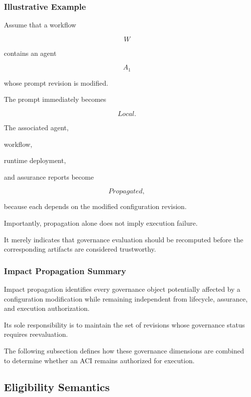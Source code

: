 \documentclass[10pt]{article}
\begin{document}
\subsubsection{Illustrative Example}

Assume that a workflow

\[
W
\]

contains an agent

\[
A_1
\]

whose prompt revision is modified.

The prompt immediately becomes

\[
Local.
\]

The associated agent,

workflow,

runtime deployment,

and assurance reports become

\[
Propagated,
\]

because each depends on the modified configuration revision.

Importantly, propagation alone does not imply execution failure.

It merely indicates that governance evaluation should be recomputed before the
corresponding artifacts are considered trustworthy.

\subsubsection{Impact Propagation Summary}

Impact propagation identifies every governance object potentially affected by a
configuration modification while remaining independent from lifecycle,
assurance, and execution authorization.

Its sole responsibility is to maintain the set of revisions whose governance
status requires reevaluation.

The following subsection defines how these governance dimensions are combined
to determine whether an ACI remains authorized for execution.

\subsection{Eligibility Semantics}
\label{subsec:eligibility}
\end{document}
